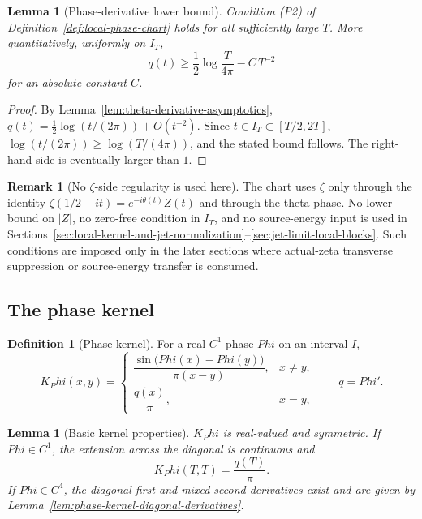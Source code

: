 \documentclass[11pt,a4paper]{amsart}
\def\Phi{Phi}%
\numberwithin{equation}{section}
\theoremstyle{plain}
\newtheorem{lemma}[theorem]{Lemma}
\theoremstyle{definition}
\newtheorem{definition}[theorem]{Definition}
\newtheorem{remark}[theorem]{Remark}
\newcommand{\Ph}{\Phi}
\begin{document}
\begin{lemma}[Phase-derivative lower bound]
\label{lem:phase-derivative-lower-bound}
Condition \textup{(P2)} of Definition~\ref{def:local-phase-chart}
holds for all sufficiently large \(T\).  More quantitatively, uniformly
on \(I_T\),
\[
        q(t)\ge \frac12\log\frac{T}{4\pi}-C\,T^{-2}
\]
for an absolute constant \(C\).
\end{lemma}

\begin{proof}
By Lemma~\ref{lem:theta-derivative-asymptotics},
\(q(t)=\tfrac12\log(t/(2\pi))+O(t^{-2})\).  Since
\(t \in I_T \subset [T/2, 2T]\),
\(\log(t/(2\pi)) \ge \log(T/(4\pi))\), and the stated bound follows.
The right-hand side is eventually larger than \(1\).
\end{proof}

\begin{remark}[No \(\zeta\)-side regularity is used here]
\label{rem:chart-regularity-zeta-side}
The chart uses \(\zeta\) only through the identity
\(\zeta(1/2+it)=e^{-i\theta(t)}Z(t)\) and through the theta phase.
No lower bound on \(|Z|\), no zero-free condition in \(I_T\), and no
source-energy input is used in
Sections~\ref{sec:local-kernel-and-jet-normalization}--\ref{sec:jet-limit-local-blocks}.
Such conditions are imposed only in the later sections where
actual-zeta transverse suppression or source-energy transfer is
consumed.
\end{remark}

\subsection{The phase kernel}
\label{subsec:phase-kernel}

\begin{definition}[Phase kernel]
\label{def:phase-kernel}
For a real \(C^1\) phase \(\Ph\) on an interval \(I\),
\begin{equation}
\label{eq:phase-kernel}
K_\Ph(x,y)=
\begin{cases}
\dfrac{\sin\bigl(\Ph(x)-\Ph(y)\bigr)}{\pi(x-y)}, & x\ne y,\\[1.2ex]
\dfrac{q(x)}{\pi}, & x=y,
\end{cases}
\qquad q=\Ph'.
\end{equation}
\end{definition}

\begin{lemma}[Basic kernel properties]
\label{lem:phase-kernel-properties}
\(K_\Ph\) is real-valued and symmetric.  If \(\Ph\in C^1\), the
extension across the diagonal is continuous and
\[
        K_\Ph(T,T)=\frac{q(T)}{\pi}.
\]
If \(\Ph\in C^4\), the diagonal first and mixed second derivatives
exist and are given by
Lemma~\ref{lem:phase-kernel-diagonal-derivatives}.
\end{lemma}
\end{document}
